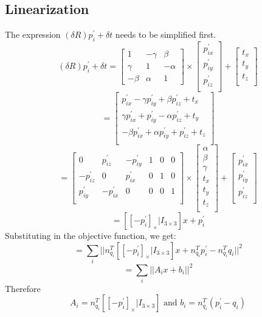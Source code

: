 \documentclass[12pt, a4paper]{article}
\begin{document}
\subsection{Linearization}
The expression $(\delta R)p_i^{'} + \delta t$ needs to be simplified first.
\[(\delta R)p_i^{'} + \delta t = \begin{bmatrix}
  1 & -\gamma & \beta\\
  \gamma & 1 & -\alpha\\
  -\beta & \alpha & 1
\end{bmatrix} \times \begin{bmatrix}
  p_{ix}^{'}\\
  p_{iy}^{'}\\
  p_{iz}^{'}\\
\end{bmatrix} + \begin{bmatrix}
  t_x\\
  t_y\\
  t_z\\
\end{bmatrix}\]
\[ = \begin{bmatrix}
  p_{ix}^{'} -\gamma p_{iy}^{'} + \beta p_{iz}^{'} + t_x\\
  \gamma p_{ix}^{'} + p_{iy}^{'} - \alpha p_{iz}^{'} + t_y\\
  -\beta p_{ix}^{'} + \alpha p_{iy}^{'} + p_{iz}^{'} + t_z\\
\end{bmatrix}\]
\[=\begin{bmatrix}
  0 & p_{iz}^{'} & -p_{iy}^{'} & 1 & 0 & 0\\
  -p_{iz}^{'} & 0 & p_{ix}^{'} & 0 & 1 & 0\\
  p_{iy}^{'} & -p_{ix}^{'} & 0 & 0 & 0 & 1\\
\end{bmatrix}\times\begin{bmatrix}
  \alpha \\
  \beta \\
  \gamma \\
  t_x \\
  t_y \\
  t_z \\
\end{bmatrix} + \begin{bmatrix}
  p_{ix}^{'} \\
  p_{iy}^{'} \\
  p_{iz}^{'} \\
\end{bmatrix}\]
\[= \left[[-p_{i}^{'}]_\times | I_{3\times 3}\right]x + p_{i}^{'}\]
Substituting in the objective function, we get:
\[= \sum_{i}||n_{q_i}^T\left[[-p_{i}^{'}]_\times | I_{3\times 3}\right]x + n_{q_i}^Tp_{i}^{'} - n_{q_i}^Tq_i||^2\]
\[=\sum_{i}||A_ix + b_i||^2\]
Therefore
\[A_i = n_{q_i}^T\left[[-p_{i}^{'}]_\times | I_{3\times 3}\right] \text{ and } b_i = n_{q_i}^T(p_{i}^{'} - q_i)\]
\end{document}
